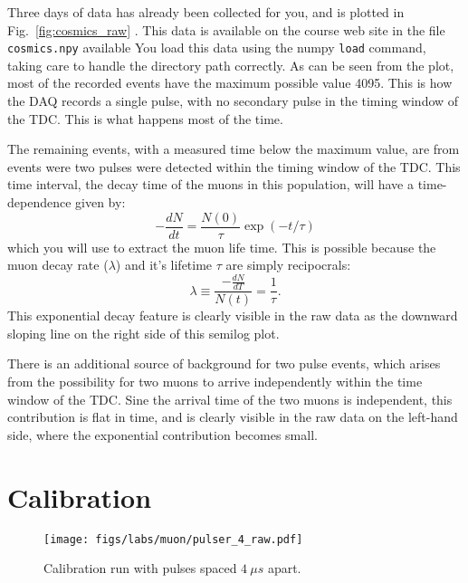 Three days of data has already been collected for you, and is plotted
in Fig.~\ref{fig:cosmics_raw} .  This data is available on the course
web site in the file {\tt cosmics.npy} available You load this data
using the numpy {\tt load} command, taking care to handle the
directory path correctly.  As can be seen from the plot, most of the
recorded events have the maximum possible value 4095.  This is how the
DAQ records a single pulse, with no secondary pulse in the timing
window of the TDC.  This is what happens most of the time.

The remaining events, with a measured time below the maximum value, are from events were two pulses were detected within the timing window of the TDC.  This time
interval, the decay time of the muons in this population, will have a
time-dependence given by:
\begin{displaymath}
-\frac{dN}{dt} = \frac{N(0)}{\tau} \exp(-t/\tau)
\end{displaymath}
which you will use to extract the muon life time.  This is possible because the muon decay rate ($\lambda$)
and it's lifetime $\tau$ are simply recipocrals:
\begin{displaymath}
\lambda \equiv \frac{-\frac{dN}{dT}}{N(t)} = \frac{1}{\tau}.
\end{displaymath}
This exponential decay feature is clearly visible in the raw data as the downward sloping line on the right side of this semilog plot.

There is an additional source of background for two pulse events, which arises from the possibility for two muons to arrive independently within the time window of the TDC.   Sine the arrival time of the two muons is independent, this contribution is flat in time, and is clearly visible in the raw data on the left-hand side, where the exponential contribution becomes small.

\section{Calibration}

\begin{figure}[htbp]
\begin{center}
{\texttt{[image: figs/labs/muon/pulser\_4\_raw.pdf]}}\\
\end{center}
\caption{\label{fig:pulser_raw}  Calibration run with pulses spaced $4~\mu s$ apart.}
\end{figure}

